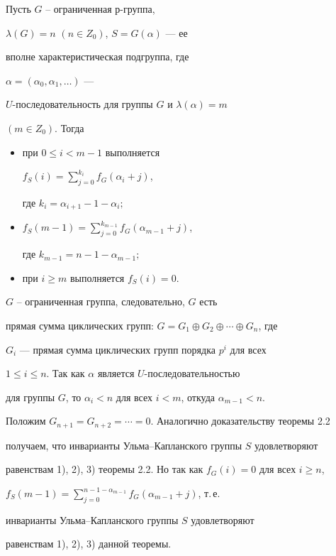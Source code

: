 \begin{thms}


Пусть $G$ -- ограниченная $р$-группа,


$\lambda(G)=n$ $(n\in Z_0)$, $S=G(\alpha)$ --- ее


вполне характеристическая подгруппа, где


$\alpha=(\alpha_0,\alpha_1,\dotsc)$ ---


$U$-последовательность для группы $G$ и $\lambda(\alpha)=m$


$(m \in Z_0)$. Тогда


\begin{itemize}


\item[1)] при $0\leq i<m-1$ выполняется


$f_S(i)=\sum\limits_{j=0}^{k_i} f_G(\alpha_i+j)$,


где $k_i=\alpha_{i+1}-1-\alpha_i;$


\item[2)] $f_S(m-1)=\sum\limits_{j=0}^{k_{m-1}} f_G(\alpha_{m-1}+j)$,


где $k_{m-1}=n-1-\alpha_{m-1};$


\item[3)] при $i\geq m$ выполняется $f_S(i)=0$.


\end{itemize}


\end{thms}





\begin{pf}


$G$ -- ограниченная группа, следовательно, $G$ есть


прямая сумма циклических групп: $G=G_1\oplus G_2\oplus\dotsb\oplus G_n$, где


$G_i$ --- прямая сумма циклических групп порядка $p^i$ для всех


$1\leq i\leq n$. Так как $\alpha$ является $U$-последовательностью


для группы $G$, то $\alpha_i<n$ для всех $i<m$, откуда $\alpha_{m-1}<n$.


Положим $G_{n+1}=G_{n+2}=\dotsb=0$. Аналогично доказательству теоремы 2.2


получаем, что инварианты Ульма--Капланского группы $S$ удовлетворяют


равенствам 1), 2), 3) теоремы 2.2. Но так как $f_G(i)=0$ для всех $i\geq n$,


$f_S(m-1)=\sum\limits_{j=0}^{n-1-\alpha_{m-1}} f_G(\alpha_{m-1}+j)$, т.\,е.\


инварианты Ульма--Капланского группы $S$ удовлетворяют


равенствам 1), 2), 3) данной теоремы.


\end{pf}





